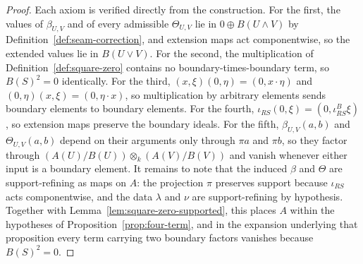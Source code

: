 \documentclass[11pt]{article}
\begin{document}
\begin{proof}
Each axiom is verified directly from the construction. For the first, the values of \(\beta_{U,V}\) and of every admissible \(\Theta_{U,V}\) lie in \(0\oplus B(U\wedge V)\) by Definition~\ref{def:seam-correction}, and extension maps act componentwise, so the extended values lie in \(B(U\vee V)\). For the second, the multiplication of Definition~\ref{def:square-zero} contains no boundary-times-boundary term, so \(B(S)^2=0\) identically. For the third, \((x,\xi)(0,\eta)=(0,x\cdot\eta)\) and \((0,\eta)(x,\xi)=(0,\eta\cdot x)\), so multiplication by arbitrary elements sends boundary elements to boundary elements. For the fourth, \(\iota_{RS}(0,\xi)=(0,\iota^B_{RS}\xi)\), so extension maps preserve the boundary ideals. For the fifth, \(\beta_{U,V}(a,b)\) and \(\Theta_{U,V}(a,b)\) depend on their arguments only through \(\pi a\) and \(\pi b\), so they factor through \((A(U)/B(U))\otimes_k(A(V)/B(V))\) and vanish whenever either input is a boundary element. It remains to note that the induced \(\beta\) and \(\Theta\) are support-refining as maps on \(A\): the projection \(\pi\) preserves support because \(\iota_{RS}\) acts componentwise, and the data \(\lambda\) and \(\nu\) are support-refining by hypothesis. Together with Lemma~\ref{lem:square-zero-supported}, this places \(A\) within the hypotheses of Proposition~\ref{prop:four-term}, and in the expansion underlying that proposition every term carrying two boundary factors vanishes because \(B(S)^2=0\).
\end{proof}
\end{document}
